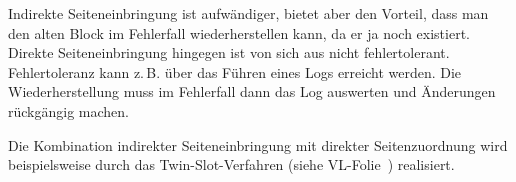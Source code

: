 \begin{enumerate}[a)]
\begin{solution}
Indirekte Seiteneinbringung ist aufwändiger, bietet aber den Vorteil, dass man den alten Block im Fehlerfall wiederherstellen kann, da er ja noch existiert.
 Direkte Seiteneinbringung hingegen ist von sich aus nicht fehlertolerant. Fehlertoleranz kann z.\,B. über das Führen eines Logs erreicht werden. Die Wiederherstellung muss im Fehlerfall dann das Log auswerten und Änderungen rückgängig machen.

Die Kombination indirekter Seiteneinbringung mit direkter Seitenzuordnung wird beispielsweise durch das Twin-Slot-Verfahren (siehe VL-Folie~\TwinSlot) realisiert.
\end{solution}
\end{enumerate}
